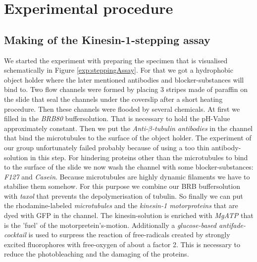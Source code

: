 \section{Experimental procedure}
	\subsection{Making of the Kinesin-1-stepping assay}
	
		
		We started the experiment with preparing the specimen that is visualised schematically in Figure \ref{exp:steppingAssay}. For that we got a hydrophobic object holder where the later mentioned antibodies and blocker-substances will bind to. Two flow channels were formed by placing 3 stripes made of paraffin on the slide that seal the channels under the coverslip after a short heating procedure. Then these channels were flooded by several chemicals. At first we filled in the \textit{BRB80} buffersolution. That is necessary to hold the pH-Value approximately constant. Then we put the \textit{Anti-$\beta$-tubulin antibodies} in the channel that bind the microtubules to the surface of the object holder. The experiment of our group unfortunately failed probably because of using a too thin antibody-solution in this step. For hindering proteins other than the microtubules to bind to the surface of the slide we now wash the channel with some blocker-substances: \textit{F127} and \textit{Casein}. Because microtubules are highly dynamic filaments we have to stabilise them somehow. For this purpose we combine our BRB buffersolution with \textit{taxol} that prevents the depolymerisation of tubulin. So finally we can put the rhodamine-labeled \textit{microtubules} and the \textit{kinesin-1 motorproteins} that are dyed with GFP in the channel. The kinesin-solution is enriched with \textit{MgATP} that is the 'fuel' of the motorpretein's-motion. Additionally a \textit{glucose-based antifade-cocktail} is used to surpress the reaction of free-radicals created by strongly excited fluorophores with free-oxygen of about a factor 2. This is necessary to reduce the photobleaching and the damaging of the proteins.
